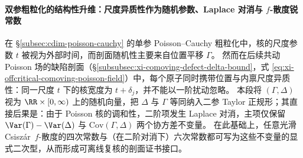 \paragraph{双参粗粒化的结构性升维：尺度异质性作为随机参数、Laplace 对消与 \texorpdfstring{$f$}{f}-散度锐常数}
在 \S\ref{subsec:cdim-poisson-cauchy} 的单参 Poisson--Cauchy 粗粒化中，核的尺度参数 \(t\) 被视为外部时间，而剖面随机性主要来自位置平移 \(\Gamma\)。
然而在后续共动 Poisson 场的缺陷剖面（\S\ref{subsubsec:xi-comoving-defect-delta-bound}，式 \eqref{eq:xi-offcritical-comoving-poisson-field}）中，每个原子同时携带位置与内禀尺度异质性：同一尺度 \(t\) 下的核宽度为 \(t+\delta_j\)，并不能以一阶扰动忽略。
本段将 \((\Gamma,\Delta)\) 视为 \(\RR\times[0,\infty)\) 上的随机向量，把 \(\Delta\) 与 \(\Gamma\) 等同纳入二参 Taylor 正规形；其直接后果是：由于 Poisson 核的调和性，二阶项发生 Laplace 对消，主项仅保留 \(\Var(\Gamma)-\Var(\Delta)\) 与 \(\mathrm{Cov}(\Gamma,\Delta)\) 两个协方差不变量。
在此基础上，任意光滑 Csiszár \(\,f\)-散度的四次常数与（在二阶对消下）六次常数都可写为这些不变量的显式二次型，从而形成可离线复核的剖面证书接口。

